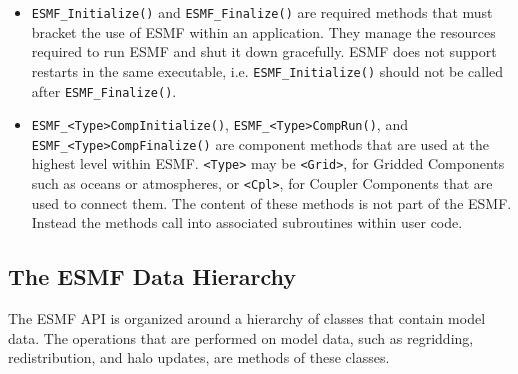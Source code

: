 \begin{itemize}

\item {\tt ESMF\_Initialize()} and {\tt ESMF\_Finalize()} are required 
methods that must bracket the use of ESMF within an application.  
They manage the resources required to run ESMF and shut it down
gracefully.  ESMF does not support restarts in the same executable, i.e.
{\tt ESMF\_Initialize()} should not be called after {\tt ESMF\_Finalize()}.
\item {\tt ESMF\_<Type>CompInitialize()}, {\tt ESMF\_<Type>CompRun()}, and {\tt ESMF\_<Type>CompFinalize()} are component methods that are used at the 
highest level within ESMF.  {\tt <Type>} may be {\tt <Grid>}, for 
Gridded Components such as oceans or atmospheres, or
{\tt <Cpl>}, for Coupler Components that are used to connect 
them.  The content of these methods is not part of the ESMF.  
Instead the methods call into associated subroutines within 
user code.

\end{itemize}

\subsection{The ESMF Data Hierarchy}

The ESMF API is organized around a hierarchy of classes that
contain model data.  The operations that are performed
on model data, such as regridding, redistribution, and halo 
updates, are methods of these classes.  

